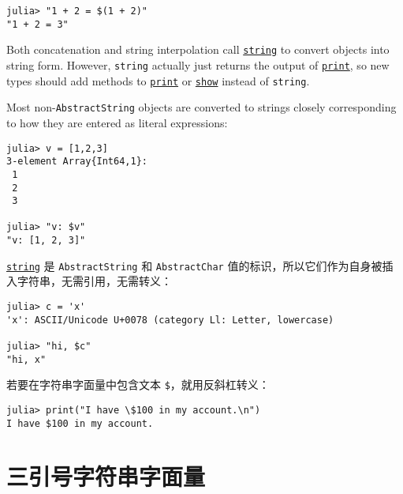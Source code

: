 \begin{verbatim}
julia> "1 + 2 = $(1 + 2)"
"1 + 2 = 3"
\end{verbatim}



Both concatenation and string interpolation call \hyperlink{7919678712989769360}{\texttt{string}} to convert objects into string form. However, \texttt{string} actually just returns the output of \hyperlink{8248717042415202230}{\texttt{print}}, so new types should add methods to \hyperlink{8248717042415202230}{\texttt{print}} or \hyperlink{14071376285304310153}{\texttt{show}} instead of \texttt{string}.



Most non-\texttt{AbstractString} objects are converted to strings closely corresponding to how they are entered as literal expressions:




\begin{verbatim}
julia> v = [1,2,3]
3-element Array{Int64,1}:
 1
 2
 3

julia> "v: $v"
"v: [1, 2, 3]"
\end{verbatim}



\hyperlink{7919678712989769360}{\texttt{string}} 是 \texttt{AbstractString} 和 \texttt{AbstractChar} 值的标识，所以它们作为自身被插入字符串，无需引用，无需转义：




\begin{verbatim}
julia> c = 'x'
'x': ASCII/Unicode U+0078 (category Ll: Letter, lowercase)

julia> "hi, $c"
"hi, x"
\end{verbatim}



若要在字符串字面量中包含文本 \texttt{\$}，就用反斜杠转义：




\begin{verbatim}
julia> print("I have \$100 in my account.\n")
I have $100 in my account.
\end{verbatim}



\hypertarget{6215712550513853493}{}


\section{三引号字符串字面量}



